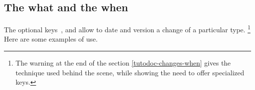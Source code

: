 \documentclass[10pt, a4paper, theme = color]{tutodoc}
\begin{document}
\subsection{The what and the when}

The optional keys \,,  and  allow to date and version a change of a particular type.%
\footnote{
	The warning at the end of the section \ref{tutodoc-changes-when} gives the technique used behind the scene, while showing the need to offer specialized keys.
}
Here are some examples of use.

\end{document}
